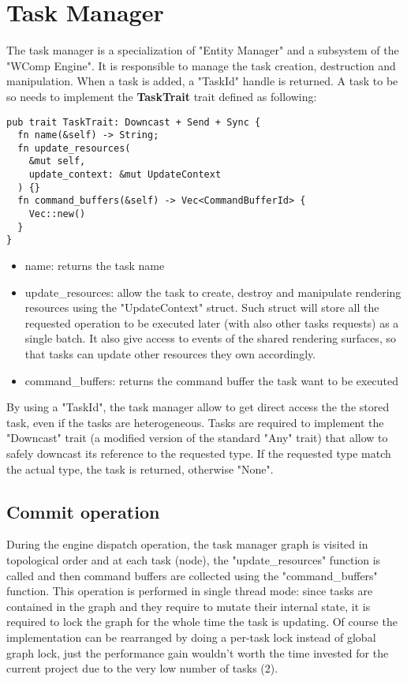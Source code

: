\section{Task Manager}
The task manager is a specialization of "Entity Manager" and a subsystem of the "WComp Engine". It is responsible to manage the task creation, destruction and manipulation. 
When a task is added, a "TaskId" handle is returned. A task to be so needs to implement the \textbf{TaskTrait} trait defined as following:
\begin{lstlisting}
pub trait TaskTrait: Downcast + Send + Sync {
  fn name(&self) -> String;
  fn update_resources(
  	&mut self, 
  	update_context: &mut UpdateContext
  ) {}
  fn command_buffers(&self) -> Vec<CommandBufferId> {
  	Vec::new()
  }
}
\end{lstlisting}
\begin{itemize}
    \item name: returns the task name
	\item update\_resources: allow the task to create, destroy and manipulate rendering resources using the "UpdateContext" struct. Such struct will store all the requested operation to be executed later (with also other tasks requests) as a single batch. It also give access to events of the shared rendering surfaces, so that tasks can update other resources they own accordingly.
	\item command\_buffers: returns the command buffer the task want to be executed
\end{itemize}
By using a "TaskId", the task manager allow to get direct access the the stored task, even if the tasks are heterogeneous. Tasks are required to implement the "Downcast" trait (a modified version of the standard "Any" trait) that allow to safely downcast its reference to the requested type. If the requested type match the actual type, the task is returned, otherwise "None".
\subsection{Commit operation}
During the engine dispatch operation, the task manager graph is visited in topological order and at each task (node), the "update\_resources" function is called and then command buffers are collected using the "command\_buffers" function. This operation is performed in single thread mode: since tasks are contained in the graph and they require to mutate their internal state, it is required to lock the graph for the whole time the task is updating. Of course the implementation can be rearranged by doing a per-task lock instead of global graph lock, just the performance gain wouldn't worth the time invested for the current project due to the very low number of tasks (2).


